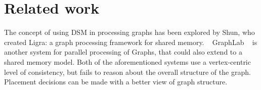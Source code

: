 \section{Related work}
\label{sec:related}


The concept of using DSM in processing graphs has been explored by Shun, who
created Ligra: a graph processing framework for shared memory. ~\cite{Shun:2013:ligra} 
GraphLab ~\cite{Low:2012:DGF:2212351.2212354} is another system for parallel
processing of Graphs, that could also extend to a shared memory model.
Both of the aforementioned systems use a vertex-centric level of consistency, 
but fails to reason about the overall structure of the graph. Placement decisions can be made with a better view of graph structure. 